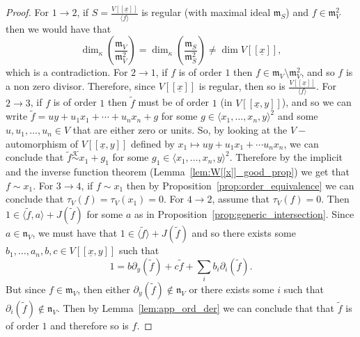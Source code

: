 \documentclass{article}
\newcommand{\equivk}{\overset{\mathcal{K}}{\sim}}
\newcommand{\maxV}{\mathfrak{m}_V}
\newcommand{\naxV}{\mathfrak{n}_V}
\newcommand{\Vx}{V[[\underline{x}]]}
\newcommand{\Vxy}{V[[\underline{x},y]]}
\numberwithin{theorem}{section}
\begin{document}
\begin{proof}
    For $1 \to 2$, if $S=\frac{\Vx}{\langle f \rangle}$ is regular (with maximal ideal $\mathfrak{m}_S$) and $f \in \maxV^2$ then we would have that
    \begin{equation*}
        \dim_\kappa\left(\frac{\maxV}{\maxV^2}\right) =  \dim_\kappa\left(\frac{\mathfrak{m}_S}{\mathfrak{m}_S^2}\right) \neq \dim \Vx,
    \end{equation*}
    \noindent which is a contradiction. For $2 \to 1$, if $f$ is of order $1$ then $f \in \maxV \setminus\maxV^2$, and so $f$ is a non zero divisor. Therefore, since $\Vx$ is regular, then so is $\frac{\Vx}{\langle f \rangle}$.  For $2 \to 3$, if $f$ is of order $1$ then $\tilde{f}$ must be of order $1$ (in $\Vxy$), and so we can write $\tilde{f}  = uy + u_1x_1 + \cdots +u_n x_n +g$ for some $g \in \langle x_1, \dots, x_n, y \rangle^2$ and some $u, u_1, \dots, u_n \in V$ that are either zero or units. So, by looking at the $V-$automorphism of $\Vxy$ defined by $x_1 \mapsto uy + u_1x_1 + \cdots u_n x_n$, we can conclude that $\tilde{f} \equivk x_1 + g_1$ for some $g_1 \in \langle x_1, \dots, x_n, y \rangle^2$. Therefore by the implicit and the inverse function theorem (Lemma~\ref{lem:W[[x]]_good_prop}) we get that $f \sim x_1$. For $3 \to 4$, if $f \sim x_1$ then by Proposition~\ref{prop:order_equivalence} we can conclude that $\tau_V\left(f\right)=\tau_V\left(x_1\right)=0$. For $4 \to 2$,  assume that $\tau_V \left(f\right)=0$. Then $1 \in \langle \tilde{f},a \rangle + J(\tilde{f})$ for some $a$ as in Proposition~\ref{prop:generic_intersection}. Since $a\in \naxV$, we must have that $1 \in \langle \tilde{f} \rangle + J(\tilde{f})$ and so there exists some $b_1, \dots, a_n,b, c \in \Vxy$ such that 
    \begin{equation*}
        1 = b\partial_y(\tilde{f}) + c\tilde{f} + \sum_i b_i \partial_i(\tilde{f}).
    \end{equation*}
     \noindent But since $f \in \maxV$, then either $\partial_y(\tilde{f}) \notin \naxV$ or there exists some $i$ such that $\partial_i(\tilde{f}) \notin \naxV$. Then by Lemma~\ref{lem:app_ord_der} we can conclude that that $\tilde{f}$ is of order $1$ and therefore so is $f$.
\end{proof}
\end{document}
